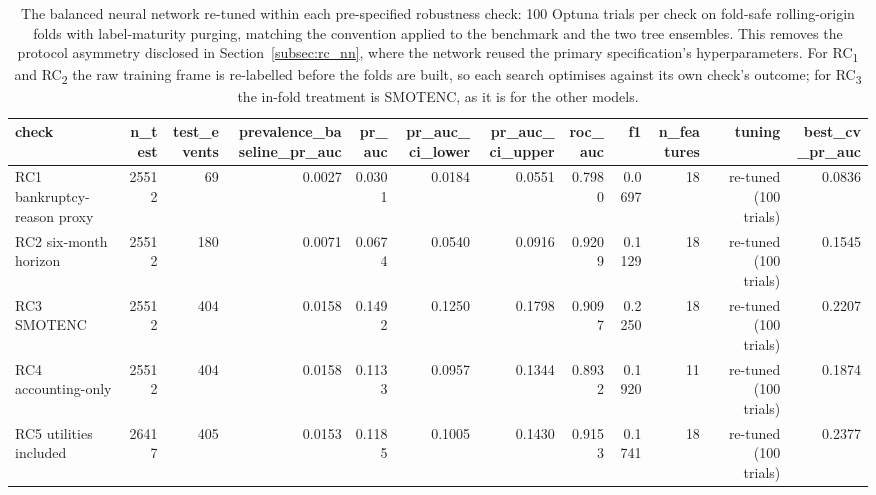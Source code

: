 \begin{table}[htbp]
\centering
\caption{The balanced neural network re-tuned within each pre-specified robustness check: 100 Optuna trials per check on fold-safe rolling-origin folds with label-maturity purging, matching the convention applied to the benchmark and the two tree ensembles. This removes the protocol asymmetry disclosed in Section~\ref{subsec:rc_nn}, where the network reused the primary specification's hyperparameters. For RC\textsubscript{1} and RC\textsubscript{2} the raw training frame is re-labelled before the folds are built, so each search optimises against its own check's outcome; for RC\textsubscript{3} the in-fold treatment is SMOTENC, as it is for the other models.}
\label{tab:rc_nn_retuned}
\small
\begin{tabular}{lrrrrrrrrrrr}
\toprule
check & n\_test & test\_events & prevalence\_baseline\_pr\_auc & pr\_auc & pr\_auc\_ci\_lower & pr\_auc\_ci\_upper & roc\_auc & f1 & n\_features & tuning & best\_cv\_pr\_auc \\
\midrule
RC1 bankruptcy-reason proxy & 25512 & 69 & 0.0027 & 0.0301 & 0.0184 & 0.0551 & 0.7980 & 0.0697 & 18 & re-tuned (100 trials) & 0.0836 \\
RC2 six-month horizon & 25512 & 180 & 0.0071 & 0.0674 & 0.0540 & 0.0916 & 0.9209 & 0.1129 & 18 & re-tuned (100 trials) & 0.1545 \\
RC3 SMOTENC & 25512 & 404 & 0.0158 & 0.1492 & 0.1250 & 0.1798 & 0.9097 & 0.2250 & 18 & re-tuned (100 trials) & 0.2207 \\
RC4 accounting-only & 25512 & 404 & 0.0158 & 0.1133 & 0.0957 & 0.1344 & 0.8932 & 0.1920 & 11 & re-tuned (100 trials) & 0.1874 \\
RC5 utilities included & 26417 & 405 & 0.0153 & 0.1185 & 0.1005 & 0.1430 & 0.9153 & 0.1741 & 18 & re-tuned (100 trials) & 0.2377 \\
\bottomrule
\end{tabular}
\end{table}
